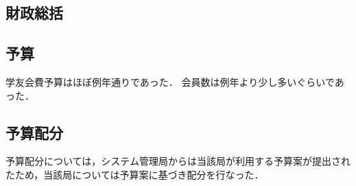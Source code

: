 \subsection*{財政総括}


\subsection*{予算}
学友会費予算はほぼ例年通りであった．
会員数は例年より少し多いぐらいであった．

\subsection*{予算配分}
予算配分については，システム管理局からは当該局が利用する予算案が提出されたため，当該局については予算案に基づき配分を行なった．
